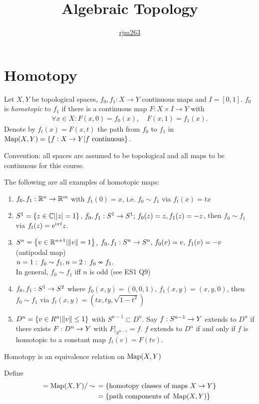 \documentclass[a4paper,11pt]{article}
\title{\boldmath Algebraic Topology}
\author{\href{https://github.com/rjm263}{rjm263}}
\begin{document}
	
	\maketitle
	\flushbottom
	\newpage

	\section{Homotopy}
		
		\begin{defi}
			Let \(X,Y\) be topological spaces, \(f_0,f_1:X\rightarrow Y\) continuous maps 
			and \(I=[0,1]\). \(f_0\) is \textit{homotopic} to \(f_1\) if there is a continuous map 
			\(F:X\times I\rightarrow Y\) with 
			\begin{align}
			\forall x\in X: F(x,0)=f_0(x),\quad F(x,1)=f_1(x).
			\end{align}
			Denote by \(f_t(x)=F(x,t)\) the path from \(f_0\) to \(f_1\) in 
			\(\operatorname{Map}(X,Y)=\{f:X\rightarrow Y|f\text{ continuous}\}\).
		\end{defi}
		Convention: all spaces are assumed to be topological and all maps to be continuous 
		for this course.
		\begin{eg}
			The following are all examples of homotopic maps:
			\begin{enumerate}
				\item \(f_0,f_1:\mathbb{R}^n\rightarrow\mathbb{R}^m\) with \(f_1(0)=x\), i.e. \(f_0\sim f_1\) via 
				\(f_t(x)=t x\)
				\item \(S^1=\left\{ z\in\mathbb{C}||z|=1\right\},\,f_0,f_1:S^1\rightarrow S^1;\,f_0(z)=z,f_1(z)=-z\), then \(f_0\sim f_1\) via \(f_t(z)=\mathrm{e}^{\mathrm{i}\pi t}z\).
				\item \(S^n=\left\{ v\in\mathbb{R}^{n+1}|\norm{v}=1 \right\}\), \(f_0,f_1:S^n\rightarrow S^n,\,f_0(v)=v,\,f_1(v)=-v\) (antipodal map)\\
				\(n=1:\,f_0\sim f_1,\\ n=2:\,f_0\nsim f_1.\)\\ In general, \(f_0\sim f_1\) iff $n$ is odd (see ES1 Q9)
				\item \(f_0,f_1: S^1\rightarrow S^2\) where \(f_0(x,y)=(0,0,1),\,f_1(x,y)=(x,y,0)\), then \(f_0\sim f_1\) via \(f_t(x,y)=(tx,ty,\sqrt{1-t^2})\)
				\item \(D^n=\left\{ v\in R^n|\norm{v}\le1\right\}\) with \(S^{n-1}\subset D^n\). Say \(f:S^{n-1}\rightarrow Y\) extends to \(D^n\) if there exists \(F:D^n\rightarrow Y\) with \(F|_{S^{n-1}}=f\). $f$ extends to $D^n$ if and only if $f$ is homotopic to a constant map $f_t(v)=F(tv)$.
			\end{enumerate}
		\end{eg}
		\begin{lemma}
		Homotopy is an equivalence relation on $\operatorname{Map}(X,Y)$ 
		\end{lemma}
		\begin{defi}
		Define 
		\begin{align*}
			[X,Y]=\map(X,Y)/\sim\,&=\left\{ \text{homotopy classes of maps }X\ra Y\right\}\\&=\left\{ \text{path components of }\map(X,Y)\right\}
		\end{align*}
		\end{defi}
		
\end{document}
